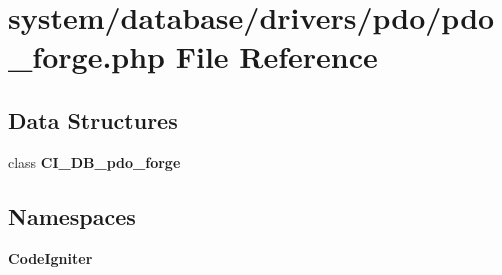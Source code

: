 \section{system/database/drivers/pdo/pdo\-\_\-forge.php File Reference}
\label{pdo__forge_8php}
\subsection*{Data Structures}
\begin{DoxyCompactItemize}
\item 
class {\bf C\-I\-\_\-\-D\-B\-\_\-pdo\-\_\-forge}
\end{DoxyCompactItemize}
\subsection*{Namespaces}
\begin{DoxyCompactItemize}
\item 
{\bf Code\-Igniter}
\end{DoxyCompactItemize}
